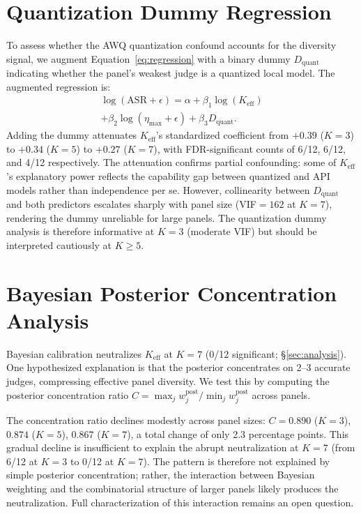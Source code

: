 \FloatBarrier
\section{Quantization Dummy Regression}
\label{app:quant_dummy}

To assess whether the AWQ quantization confound accounts for the diversity signal, we augment Equation~\ref{eq:regression} with a binary dummy $D_{\mathrm{quant}}$ indicating whether the panel's weakest judge is a quantized local model. The augmented regression is:
\begin{multline}
\log(\mathrm{ASR} + \epsilon) = \alpha + \beta_1 \log(K_{\mathrm{eff}}) \\
 + \beta_2 \log(\eta_{\max} + \epsilon) + \beta_3 D_{\mathrm{quant}}.
\end{multline}
Adding the dummy attenuates $K_{\mathrm{eff}}$'s standardized coefficient from $+0.39$ ($K{=}3$) to $+0.34$ ($K{=}5$) to $+0.27$ ($K{=}7$), with FDR-significant counts of 6/12, 6/12, and 4/12 respectively. The attenuation confirms partial confounding: some of $K_{\mathrm{eff}}$'s explanatory power reflects the capability gap between quantized and API models rather than independence per se. However, collinearity between $D_{\mathrm{quant}}$ and both predictors escalates sharply with panel size (VIF${=}162$ at $K{=}7$), rendering the dummy unreliable for large panels. The quantization dummy analysis is therefore informative at $K{=}3$ (moderate VIF) but should be interpreted cautiously at $K{\geq}5$.

\FloatBarrier
\section{Bayesian Posterior Concentration Analysis}
\label{app:bayesian_entropy}

Bayesian calibration neutralizes $K_{\mathrm{eff}}$ at $K{=}7$ (0/12 significant; \S\ref{sec:analysis}). One hypothesized explanation is that the posterior concentrates on 2--3 accurate judges, compressing effective panel diversity. We test this by computing the posterior concentration ratio $C = \max_j w_j^{\mathrm{post}} / \min_j w_j^{\mathrm{post}}$ across panels.

The concentration ratio declines modestly across panel sizes: $C = 0.890$ ($K{=}3$), $0.874$ ($K{=}5$), $0.867$ ($K{=}7$), a total change of only 2.3 percentage points. This gradual decline is insufficient to explain the abrupt neutralization at $K{=}7$ (from 6/12 at $K{=}3$ to 0/12 at $K{=}7$). The pattern is therefore not explained by simple posterior concentration; rather, the interaction between Bayesian weighting and the combinatorial structure of larger panels likely produces the neutralization. Full characterization of this interaction remains an open question.

